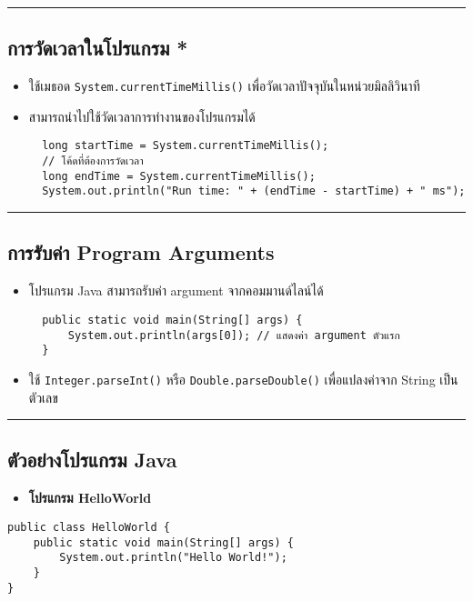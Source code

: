 \documentclass[11pt]{article}
\begin{document}
\noindent\rule{\textwidth}{0.5pt}
\subsection{การวัดเวลาในโปรแกรม *}
\label{sec:org043c231}
\begin{itemize}
\item ใช้เมธอด \texttt{System.currentTimeMillis()} เพื่อวัดเวลาปัจจุบันในหน่วยมิลลิวินาที

\item สามารถนำไปใช้วัดเวลาการทำงานของโปรแกรมได้

\begin{verbatim}
  long startTime = System.currentTimeMillis();
  // โค้ดที่ต้องการวัดเวลา
  long endTime = System.currentTimeMillis();
  System.out.println("Run time: " + (endTime - startTime) + " ms");
\end{verbatim}
\end{itemize}

\noindent\rule{\textwidth}{0.5pt}
\subsection{การรับค่า Program Arguments}
\label{sec:org43cca2b}
\begin{itemize}
\item โปรแกรม Java สามารถรับค่า argument จากคอมมานด์ไลน์ได้

\begin{verbatim}
  public static void main(String[] args) {
      System.out.println(args[0]); // แสดงค่า argument ตัวแรก
  }
\end{verbatim}

\item ใช้ \texttt{Integer.parseInt()} หรือ \texttt{Double.parseDouble()} เพื่อแปลงค่าจาก String
เป็นตัวเลข
\end{itemize}

\noindent\rule{\textwidth}{0.5pt}
\subsection{ตัวอย่างโปรแกรม Java}
\label{sec:org597d7ac}
\begin{itemize}
\item \textbf{โปรแกรม HelloWorld}
\end{itemize}

\begin{verbatim}
public class HelloWorld {
    public static void main(String[] args) {
        System.out.println("Hello World!");
    }
}
\end{verbatim}
\end{document}
